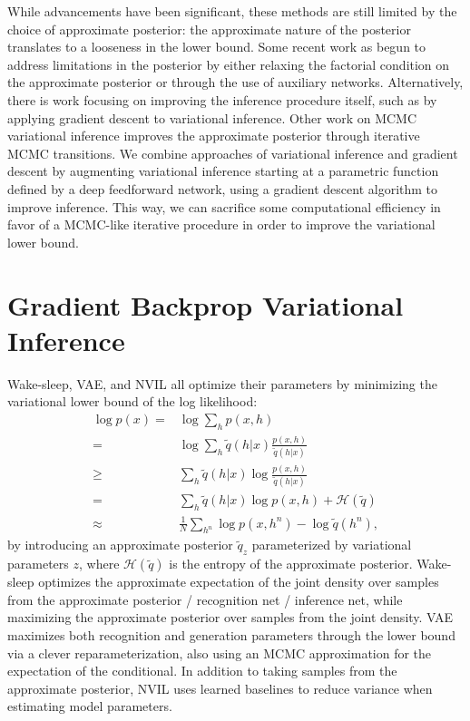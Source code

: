 \documentclass{article}
\newcommand{\HH}[0]{\mathcal{H}}
\begin{document}
While advancements have been significant, these methods are still limited by the choice of approximate posterior: the approximate nature of the posterior translates to a looseness in the lower bound. Some recent work as begun to address limitations in the posterior by either relaxing the factorial condition on the approximate posterior or through the use of auxiliary networks. Alternatively, there is work focusing on improving the inference procedure itself, such as by applying gradient descent to variational inference. Other work on MCMC variational inference improves the approximate posterior through iterative MCMC transitions. We combine approaches of variational inference and gradient descent by augmenting variational inference starting at a parametric function defined by a deep feedforward network, using a gradient descent algorithm to improve inference. This way, we can sacrifice some computational efficiency in favor of a MCMC-like iterative procedure in order to improve the variational lower bound.

\section{Gradient Backprop Variational Inference}
Wake-sleep, VAE, and NVIL all optimize their parameters by minimizing the variational lower bound of the log likelihood:
\begin{align}
    \label{eq:approx_logp}
    \log p(x) =& \log \sum_{h} p(x, h) \nonumber \\
    =& \log \sum_h \tilde{q}(h|x) \frac{p(x, h)}{\tilde{q}(h|x)} \nonumber \\
    \geq& \sum_h \tilde{q}(h|x) \log \frac{p(x, h)}{\tilde{q}(h|x)} \nonumber \\
    =& \sum_h \tilde{q}(h|x) \log p(x,h) + \HH(\tilde{q}) \nonumber \\
    \approx& \frac{1}{N} \sum_{h^n} \log p(x, h^n) - \log
    \tilde{q}(h^n),
\end{align}
by introducing an approximate posterior $\tilde{q}_z$ parameterized by variational parameters $z$, where $\HH(\tilde{q})$ is the entropy of the approximate posterior.  Wake-sleep optimizes the approximate expectation of the joint density over samples from the approximate posterior / recognition net / inference net, while maximizing the approximate posterior over samples from the joint density. VAE maximizes both recognition and generation parameters through the lower bound via a clever reparameterization, also using an MCMC approximation for the expectation of the conditional. In addition to taking samples from the approximate posterior, NVIL uses learned baselines to reduce variance when estimating model parameters.
\end{document}
